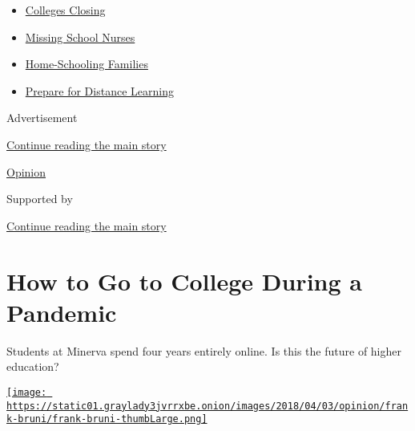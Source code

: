 \begin{itemize}
\tightlist
\item
  \href{https://www.nytimes3xbfgragh.onion/2020/08/19/us/colleges-closing-covid.html?name=styln-coronavirus-schools-reopening\&region=TOP_BANNER\&variant=undefined\&block=storyline_menu_recirc\&action=click\&pgtype=Article\&impression_id=2afbec10-e385-11ea-9f87-27c642fe12b3}{Colleges
  Closing}
\item
  \href{https://www.nytimes3xbfgragh.onion/2020/08/20/us/schools-reopening-nurses-covid.html?name=styln-coronavirus-schools-reopening\&region=TOP_BANNER\&variant=undefined\&block=storyline_menu_recirc\&action=click\&pgtype=Article\&impression_id=2afbec11-e385-11ea-9f87-27c642fe12b3}{Missing
  School Nurses}
\item
  \href{https://www.nytimes3xbfgragh.onion/2020/08/18/parenting/homeschool-families.html?name=styln-coronavirus-schools-reopening\&region=TOP_BANNER\&variant=undefined\&block=storyline_menu_recirc\&action=click\&pgtype=Article\&impression_id=2afbec12-e385-11ea-9f87-27c642fe12b3}{Home-Schooling
  Families}
\item
  \href{https://www.nytimes3xbfgragh.onion/2020/08/05/parenting/parents-distance-learning.html?name=styln-coronavirus-schools-reopening\&region=TOP_BANNER\&variant=undefined\&block=storyline_menu_recirc\&action=click\&pgtype=Article\&impression_id=2afbec13-e385-11ea-9f87-27c642fe12b3}{Prepare
  for Distance Learning}
\end{itemize}

Advertisement

\protect\hyperlink{after-top}{Continue reading the main story}

\href{/section/opinion}{Opinion}

Supported by

\protect\hyperlink{after-sponsor}{Continue reading the main story}

\hypertarget{how-to-go-to-college-during-a-pandemic}{%
\section{How to Go to College During a
Pandemic}\label{how-to-go-to-college-during-a-pandemic}}

Students at Minerva spend four years entirely online. Is this the future
of higher education?

\href{https://www.nytimes3xbfgragh.onion/by/frank-bruni}{\texttt{[image: https://static01.graylady3jvrrxbe.onion/images/2018/04/03/opinion/frank-bruni/frank-bruni-thumbLarge.png]}}

